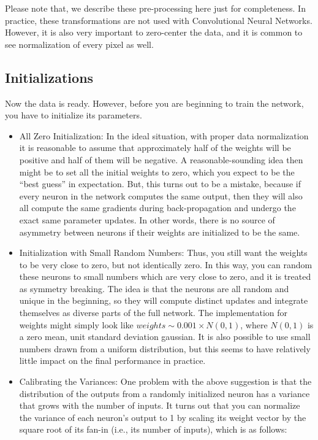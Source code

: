 \documentclass[11pt,fleqn, UTF8]{ctexbook} %
\begin{document}
Please note that, we describe these pre-processing here just for completeness. In practice, these transformations are not used with Convolutional Neural Networks. However, it is also very important to zero-center the data, and it is common to see normalization of every pixel as well.

\subsection{Initializations}
Now the data is ready. However, before you are beginning to train the network, you have to initialize its parameters.
\begin{itemize}
  \item All Zero Initialization:
  In the ideal situation, with proper data normalization it is reasonable to assume that approximately half of the weights will be positive and half of them will be negative. A reasonable-sounding idea then might be to set all the initial weights to zero, which you expect to be the “best guess” in expectation. But, this turns out to be a mistake, because if every neuron in the network computes the same output, then they will also all compute the same gradients during back-propagation and undergo the exact same parameter updates. In other words, there is no source of asymmetry between neurons if their weights are initialized to be the same.
  \item Initialization with Small Random Numbers:
  Thus, you still want the weights to be very close to zero, but not identically zero. In this way, you can random these neurons to small numbers which are very close to zero, and it is treated as symmetry breaking. The idea is that the neurons are all random and unique in the beginning, so they will compute distinct updates and integrate themselves as diverse parts of the full network. The implementation for weights might simply look like $weights\sim 0.001\times N(0,1)$, where $N(0,1)$ is a zero mean, unit standard deviation gaussian. It is also possible to use small numbers drawn from a uniform distribution, but this seems to have relatively little impact on the final performance in practice.
  \item Calibrating the Variances:
  One problem with the above suggestion is that the distribution of the outputs from a randomly initialized neuron has a variance that grows with the number of inputs. It turns out that you can normalize the variance of each neuron's output to 1 by scaling its weight vector by the square root of its fan-in (i.e., its number of inputs), which is as follows:

\end{itemize}
\end{document}
